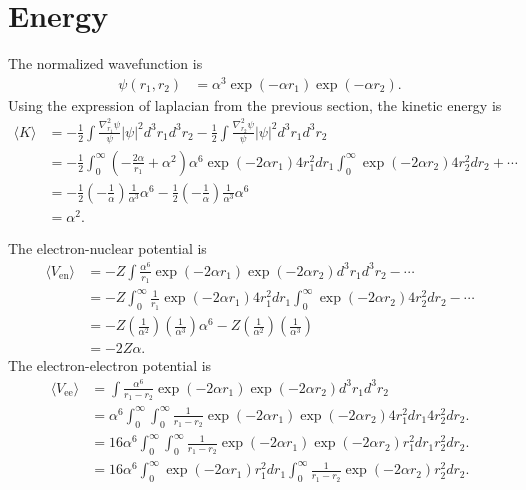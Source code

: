 \section{Energy}
The normalized wavefunction is
\begin{align}
\psi(r_1, r_2) &= \alpha^3 \exp(-\alpha r_1) \exp(-\alpha r_2).
\end{align}
Using the expression of laplacian from the previous section, the kinetic energy is
\begin{align}
\langle K \rangle &= -\frac{1}{2}\int \frac{\nabla_{r_1}^2 \psi}{\psi} |\psi|^2 d^3 r_1 d^3 r_2 -\frac{1}{2}\int \frac{\nabla_{r_2}^2 \psi}{\psi} |\psi|^2 d^3 r_1 d^3 r_2 \\
&= -\frac{1}{2} \int_0^{\infty}  \left(-\frac{2 \alpha}{r_1} + \alpha^2\right) \alpha^6 \exp(-2 \alpha r_1) 4 r_1^2 dr_1 \int_0^{\infty} \exp(-2 \alpha r_2) 4r_2^2 dr_2 + \cdots \\
&= -\frac{1}{2} \left(-\frac{1}{\alpha}\right) \frac{1}{\alpha^3} \alpha^6 -\frac{1}{2} \left(-\frac{1}{\alpha}\right) \frac{1}{\alpha^3} \alpha^6 \\
&= \boxed{\alpha^2}.
\end{align}

The electron-nuclear potential is
\begin{align}
\langle V_{\mathrm{en}} \rangle &= -Z\int \frac{\alpha^6}{r_1} \exp(-2 \alpha r_1) \exp(-2 \alpha r_2) d^3 r_1 d^3 r_2 - \cdots \\
&= -Z\int_0^{\infty} \frac{1}{r_1} \exp(-2 \alpha r_1) 4r_1^2 dr_1 \int_0^{\infty} \exp(-2 \alpha r_2) 4 r_2^2 d r_2 - \cdots \\
&= -Z \left(\frac{1}{\alpha^2} \right) \left(\frac{1}{\alpha^3} \right) \alpha^6 - Z \left(\frac{1}{\alpha^2} \right) \left(\frac{1}{\alpha^3} \right) \\
&= \boxed{-2 Z \alpha}.
\end{align}
The electron-electron potential is
\begin{align}
\langle V_{\mathrm{ee}} \rangle &= \int \frac{\alpha^6}{r_1 - r_2} \exp(-2 \alpha r_1) \exp(-2 \alpha r_2) d^3 r_1 d^3 r_2 \\
&= \alpha^6 \int_0^{\infty} \int_0^{\infty} \frac{1}{r_1 - r_2} \exp(-2 \alpha r_1) \exp(-2 \alpha r_2) 4 r_1^2 dr_1 4r_2^2 dr_2. \\
&= 16 \alpha^6 \int_0^{\infty} \int_0^{\infty} \frac{1}{r_1 - r_2} \exp(-2 \alpha r_1) \exp(-2 \alpha r_2) r_1^2 dr_1 r_2^2 dr_2. \\
&= 16 \alpha^6 \int_0^{\infty} \exp(-2 \alpha r_1) r_1^2 dr_1  \int_0^{\infty} \frac{1}{r_1 - r_2}  \exp(-2 \alpha r_2) r_2^2 dr_2. \\
\end{align}

